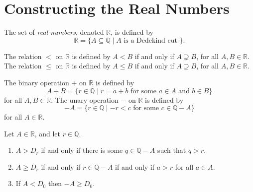 \section{Constructing the Real Numbers}
\label{real}

\begin{definition} %
	The set of \emph{real numbers}, denoted $\mathbb{R}$, is defined by
	$$
		\mathbb{R} = \{ A \subseteq \mathbb{Q} \mid A \text { is a Dedekind cut } \}.
	$$
\end{definition}

\begin{definition} %
	The relation $<$ on $\mathbb{R}$ is defined by $A < B$ if and only if $A \supsetneq B$, for all $A, B \in \mathbb{R}$. The relation $\leq$ on $\mathbb{R}$ is defined by $A \leq B$ if and only if $A \supseteq B$, for all $A, B \in \mathbb{R}$.
\end{definition}

\begin{definition} %
	\label{real:d:add}
	The binary operation $+$ on $\mathbb{R}$ is defined by
	$$
		A + B = \{ r \in \mathbb{Q} \mid r = a + b \text { for some } a \in A \text { and } b \in B \}
	$$
	for all $A, B \in \mathbb{R}$. The unary operation $-$ on $\mathbb{R}$ is defined by
	$$
		-A = \{ r \in \mathbb{Q} \mid -r < c \text { for some } c \in \mathbb{Q}-A \}
	$$
	for all $A \in \mathbb{R}$.
\end{definition}

\begin{lemma} %
	\label{real:l:mult_req}
	Let $A \in \mathbb{R}$, and let $r \in \mathbb{Q}$.
	\begin{enumerate}
		\item \label{real:l:mult_req:1}
		      $A > D_r$ if and only if there is some $q \in \mathbb{Q}-A$ such that $q > r$.
		\item \label{real:l:mult_req:2}
		      $A \geq D_r$ if and only if $r \in \mathbb{Q}-A$ if and only if $a > r$ for all $a \in A$.
		\item \label{real:l:mult_req:3}
		      If $A < D_0$ then $-A \geq D_0$.
	\end{enumerate}
\end{lemma}

